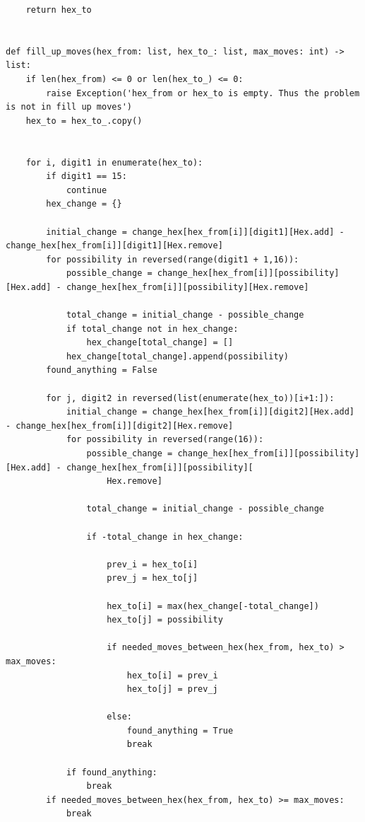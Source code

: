 \documentclass[a4paper,10pt,ngerman]{scrartcl}
\begin{document}
\begin{lstlisting}
    return hex_to


def fill_up_moves(hex_from: list, hex_to_: list, max_moves: int) -> list:
    if len(hex_from) <= 0 or len(hex_to_) <= 0:
        raise Exception('hex_from or hex_to is empty. Thus the problem is not in fill up moves')
    hex_to = hex_to_.copy()


    for i, digit1 in enumerate(hex_to):
        if digit1 == 15:
            continue
        hex_change = {}

        initial_change = change_hex[hex_from[i]][digit1][Hex.add] - change_hex[hex_from[i]][digit1][Hex.remove]
        for possibility in reversed(range(digit1 + 1,16)):
            possible_change = change_hex[hex_from[i]][possibility][Hex.add] - change_hex[hex_from[i]][possibility][Hex.remove]

            total_change = initial_change - possible_change
            if total_change not in hex_change:
                hex_change[total_change] = []
            hex_change[total_change].append(possibility)
        found_anything = False

        for j, digit2 in reversed(list(enumerate(hex_to))[i+1:]):
            initial_change = change_hex[hex_from[i]][digit2][Hex.add] - change_hex[hex_from[i]][digit2][Hex.remove]
            for possibility in reversed(range(16)):
                possible_change = change_hex[hex_from[i]][possibility][Hex.add] - change_hex[hex_from[i]][possibility][
                    Hex.remove]

                total_change = initial_change - possible_change

                if -total_change in hex_change:

                    prev_i = hex_to[i]
                    prev_j = hex_to[j]

                    hex_to[i] = max(hex_change[-total_change])
                    hex_to[j] = possibility

                    if needed_moves_between_hex(hex_from, hex_to) > max_moves:
                        hex_to[i] = prev_i
                        hex_to[j] = prev_j

                    else:
                        found_anything = True
                        break

            if found_anything:
                break
        if needed_moves_between_hex(hex_from, hex_to) >= max_moves:
            break






\end{lstlisting}
\end{document}
